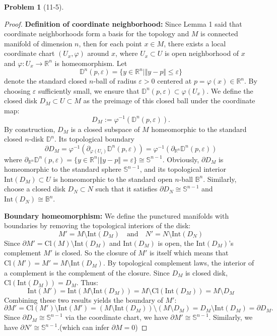 \documentclass[11pt, a4paper]{article}
\theoremstyle{definition}
\newtheorem{prob}{Problem}
\newenvironment{problem}[1][]{\begin{prob}[#1]\normalfont}{\end{prob}\vspace{1.5em}}
\begin{document}
\begin{problem}[11-5]
\begin{proof}
    \item[$1^ \circ$] \textbf{Definition of coordinate neighborhood:} Since Lemma 1 said that coordinate neighborhoods 
    form a basis for the topology and $M$ is connected manifold of dimension $n$, then for each point $x \in M$, there 
    exists a local coordinate chart $(U_x, \varphi)$ around $x$, where $U_x \subset U$ is open neighborhood of $x$ and 
    $\varphi:U_x \rightarrow \mathbb{R} ^n$ is homeomorphism. 
    Let 
    $$\mathbb{D}^n(p, \varepsilon) = \{ y \in \mathbb{R}^n \mid \Vert y - p\Vert \leq \varepsilon \}$$
    denote the standard closed $n$-ball of radius $\varepsilon > 0$ centered at $p = \varphi(x) \in \mathbb{R}^n$. By 
    choosing $\varepsilon$ sufficiently small, we ensure that $\mathbb{D}^n(p, \varepsilon) \subset \varphi(U_x)$. We define 
    the closed disk $D_M \subset U \subset M$ as the preimage of this closed ball under the coordinate map:
    $$D_M := \varphi^{-1}( \mathbb{D}^n(p, \varepsilon) ).$$
    By construction, $D_M$ is a closed subspace of $M$ homeomorphic to the standard closed $n$-disk $\mathbb{D}^n$. 
    Its topological boundary 
    $$\partial D_M = \varphi^{-1}(\partial _{\varphi (U_i)}\mathbb{D} ^n(p,\varepsilon)) = \varphi^{-1}(\partial _{\mathbb{R} ^n}\mathbb{D} ^n(p,\varepsilon))$$
    where $\partial_{\mathbb{R}^n} \mathbb{D}^n(p, \varepsilon) = \{ y \in \mathbb{R}^n \mid \Vert y - p\Vert = \varepsilon \} \cong \mathbb{S}^{n-1}$.
    Obviously, $\partial D_M$ is homeomorphic to the standard sphere $\mathbb{S}^{n-1}$, and its 
    topological interior $\text{Int}(D_M) \subset U$ is homeomorphic to the standard open $n$-ball $\mathbb{B}^n$. 
    Similarly, choose a closed disk $D_N \subset N$ such that it satisfies $ \partial D_N \cong \mathbb{S}^{n-1}$ and 
    $\text{Int}(D_N) \cong \mathbb{B}^n$. 

    \item[$2^ \circ$] \textbf{Boundary homeomorphism:} We define the punctured manifolds with boundaries by removing the topological interiors of the disk:
    $$ M' = M \setminus \text{Int}(D_M) \quad \text{and} \quad N' = N \setminus \text{Int}(D_N)$$
    Since $ \partial M' = \text{Cl}(M) \setminus \text{Int}(D_M)$ and $\text{Int}(D_M)$ is open, the $\text{Int}(D_M)$'s complement $M'$ 
    is closed. So the closure of $M'$ is itself which means that $ \text{Cl}(M') = M' = M \setminus \text{Int}(D_M)$. 
    By topological complement laws, the interior of a complement is the complement of the closure. Since $D_M$ is closed 
    disk, $\text{Cl}(\text{Int}(D_M)) = D_M$. Thus: 
    $$\text{Int}(M') = \text{Int}(M \setminus \text{Int}(D_M)) = M \setminus \text{Cl}(\text{Int}(D_M)) = M \setminus D_M$$
    Combining these two results yields the boundary of $M'$:
    $$ \partial M' = \text{Cl}(M') \setminus \text{Int}(M') = (M \setminus \text{Int}(D_M)) \setminus (M \setminus D_M) = D_M \setminus \text{Int}(D_M) = \partial D_M.$$
    Since $ \partial D_M \cong \mathbb{S}^{n-1}$ via the coordinate chart, we have $ \partial M' \cong \mathbb{S}^{n-1}$. 
    Similarly, we have $ \partial N' \cong \mathbb{S}^{n-1}$.(which can infer $\partial M = 0$)


\end{proof}
\end{problem}
\end{document}
